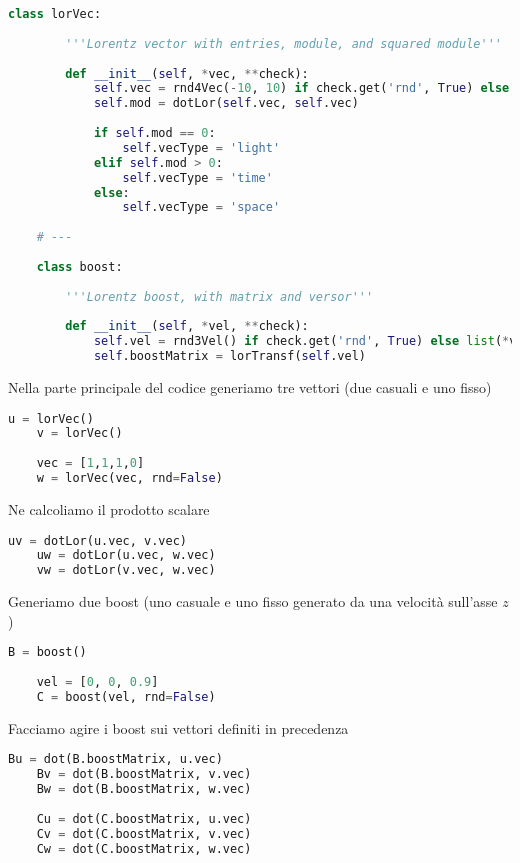\documentclass[12pt,notitlepage]{report}
\begin{document}
\begin{lstlisting}[language=Python]
	class lorVec:
	
		'''Lorentz vector with entries, module, and squared module'''
		
		def __init__(self, *vec, **check):
			self.vec = rnd4Vec(-10, 10) if check.get('rnd', True) else list(*vec)
			self.mod = dotLor(self.vec, self.vec)
		
			if self.mod == 0:
				self.vecType = 'light'
			elif self.mod > 0:
				self.vecType = 'time'
			else:
				self.vecType = 'space'
	
	# ---
	
	class boost:
	
		'''Lorentz boost, with matrix and versor'''
		
		def __init__(self, *vel, **check):
			self.vel = rnd3Vel() if check.get('rnd', True) else list(*vel)
			self.boostMatrix = lorTransf(self.vel)
\end{lstlisting}

Nella parte principale del codice generiamo tre vettori (due casuali e uno fisso)

\begin{lstlisting}[language=Python]
	u = lorVec()
	v = lorVec()
	
	vec = [1,1,1,0]
	w = lorVec(vec, rnd=False)
\end{lstlisting}

Ne calcoliamo il prodotto scalare

\begin{lstlisting}[language=Python]
	uv = dotLor(u.vec, v.vec)
	uw = dotLor(u.vec, w.vec)
	vw = dotLor(v.vec, w.vec)
\end{lstlisting}

Generiamo due boost (uno casuale e uno fisso generato da una velocità sull'asse $z$)

\begin{lstlisting}[language=Python]
	B = boost()
	
	vel = [0, 0, 0.9]
	C = boost(vel, rnd=False)
\end{lstlisting}

Facciamo agire i boost sui vettori definiti in precedenza

\begin{lstlisting}[language=Python]
	Bu = dot(B.boostMatrix, u.vec)
	Bv = dot(B.boostMatrix, v.vec)
	Bw = dot(B.boostMatrix, w.vec)
	
	Cu = dot(C.boostMatrix, u.vec)
	Cv = dot(C.boostMatrix, v.vec)
	Cw = dot(C.boostMatrix, w.vec)
\end{lstlisting}
\end{document}
